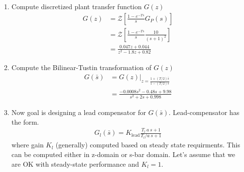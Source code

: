 \documentclass[twoside]{article}
\begin{document}
\begin{enumerate}
  \item Compute discretized plant transfer function $G(z)$
%
\begin{align*}
  G(z) &= \mathcal{Z} \left[ \frac{1-e^{-Ts}}{s} G_P(s) \right] 
\\
       &= \mathcal{Z} \left[ \frac{1-e^{-Ts}}{s} \frac{10}{(s+1)^2}
         \right] 
\\
&= \frac{0.047 z + 0.044}{z^2 - 1.8 z + 0.82}
\end{align*}
%
\item Compute the Bilinear-Tustin transformation of $G(z)$
%
\begin{align*}
  G(\bar{s}) &= G(z) |_{z = \frac{1 + (T/2) \bar{s}}{1 - (T/2)
  \bar{s}}} 
\\
&= \frac{ -0.0008 s^2 - 0.48 s + 9.98 }{s^2 + 2 s + 0.998}
\end{align*}
%

\item Now goal is designing a lead compensator for $G(\bar{s})$. 
Lead-compensator has the form.
%
\begin{align*}
  G_{l}(\bar{s}) = K_{\mathrm{lead}} \frac{T_{l} \ a \ s +
  1}{T_{l} /  a \ s + 1}
\end{align*}
%
where gain $K_{l}$ (generally) computed based on steady
state requirments. This can be computed either in z-domain or
s-bar domain. Let's assume that we are OK with steady-state 
performance and $K_{l} = 1$.


\end{enumerate}
\end{document}
